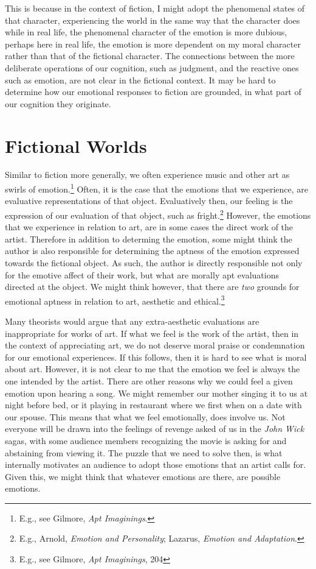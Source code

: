 \documentclass[phdthesis,12pt,final]{wuthesis}
\theoremstyle{definition}
\theoremstyle{definition}
\theoremstyle{definition}
\theoremstyle{definition}
\theoremstyle{remark}
\begin{document}
This is because in the context of fiction, I might adopt the phenomenal states of that character, experiencing the world in the same way that the character does while in real life, the phenomenal character of the emotion is more dubious, perhaps here in real life, the emotion is more dependent on my moral character rather than that of the fictional character. The connections between the more deliberate operations of our cognition, such as judgment, and the reactive ones such as emotion, are not clear in the fictional context. It may be hard to determine how our emotional responses to fiction are grounded, in what part of our cognition they originate.

\section{Fictional Worlds}\label{fictional-worlds}

Similar to fiction more generally, we often experience music and other art as swirls of emotion.\footnote{E.g., see Gilmore, \emph{Apt {Imaginings}}.} Often, it is the case that the emotions that we experience, are evaluative representations of that object. Evaluatively then, our feeling is the expression of our evaluation of that object, such as fright.\footnote{E.g., Arnold, \emph{Emotion and {Personality}}; Lazarus, \emph{Emotion and Adaptation}.} However, the emotions that we experience in relation to art, are in some cases the direct work of the artist. Therefore in addition to determing the emotion, some might think the author is also responsible for determining the aptness of the emotion expressed towards the fictional object. As such, the author is directly responsible not only for the emotive affect of their work, but what are morally apt evaluations directed at the object. We might think however, that there are \emph{two} grounds for emotional aptness in relation to art, aesthetic and ethical.\footnote{E.g., see Gilmore, \emph{Apt {Imaginings}}, 204}

Many theorists would argue that any extra-aesthetic evaluations are inappropriate for works of art. If what we feel is the work of the artist, then in the context of appreciating art, we do not deserve moral praise or condemnation for our emotional experiences. If this follows, then it is hard to see what is moral about art. However, it is not clear to me that the emotion we feel is always the one intended by the artist. There are other reasons why we could feel a given emotion upon hearing a song. We might remember our mother singing it to us at night before bed, or it playing in restaurant where we first when on a date with our spouse. This means that what we feel emotionally, does involve us. Not everyone will be drawn into the feelings of revenge asked of us in the \emph{John Wick} sagas, with some audience members recognizing the movie is asking for and abstaining from viewing it. The puzzle that we need to solve then, is what internally motivates an audience to adopt those emotions that an artist calls for. Given this, we might think that whatever emotions are there, are possible emotions.
\end{document}
